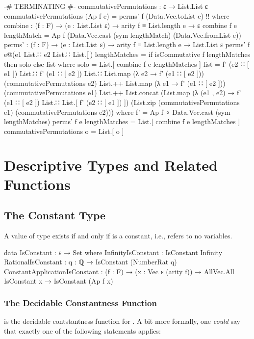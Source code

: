 \documentclass{report}
\begin{document}
\begin{code}
  {-# TERMINATING #-}
  commutativePermutations : ε → List.List ε
  commutativePermutations (Ap f e) = perms' f (Data.Vec.toList e) {!!}
    where
    combine : (f : F) → (e : List.List ε) → arity f ≡ List.length e → ε
    combine f e lengthMatch = Ap f (Data.Vec.cast (sym lengthMatch)
                                                  (Data.Vec.fromList e))
    perms' : (f : F) → (e : List.List ε) → arity f ≡ List.length e → List.List ε
    perms' f e@(e1 List.∷ e2 List.∷ List.[]) lengthMatches =
      if isCommutative f lengthMatches then solo else list
      where
      solo = List.[ combine f e lengthMatches ]
      list =
        f' (e2 ∷ [ e1 ]) List.∷ f' (e1 ∷ [ e2 ]) List.∷
        List.map (λ e2 → f' (e1 ∷ [ e2 ])) (commutativePermutations e2) List.++
        List.map (λ e1 → f' (e1 ∷ [ e2 ])) (commutativePermutations e1) List.++
        List.concat (List.map (λ (e1 , e2) → f' (e1 ∷ [ e2 ]) List.∷
                                              List.[ f' (e2 ∷ [ e1 ]) ])
                              (List.zip (commutativePermutations e1)
                                        (commutativePermutations e2)))
        where f' = Ap f ∘ Data.Vec.cast (sym lengthMatches)
    perms' f e lengthMatches = List.[ combine f e lengthMatches ]
  commutativePermutations o = List.[ o ]
\end{code}

\chapter{Descriptive Types and Related Functions}

\section{The Constant Type}
A value of type   exists if and only if  is a constant, i.e., refers to no variables.

\begin{code}
  data IsConstant : ε → Set where
    InfinityIsConstant : IsConstant Infinity
    RationalIsConstant : {q : ℚ} → IsConstant (NumberRat q)
    ConstantApplicationIsConstant :
      (f : F) →
      (x : Vec ε (arity f)) →
      AllVec.All IsConstant x →
      IsConstant (Ap f x)
\end{code}

\subsection{The Decidable Constantness Function}
 is the decidable contstantness function for .  A bit more formally, one \emph{could} say that exactly one of the following statements applies:
\end{document}
